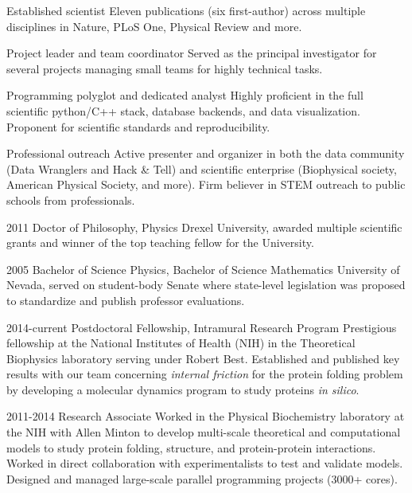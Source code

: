 \documentclass[]{scrartcl}
\begin{document}
\begin{cleanCV}

\vspace{-1em}


\Highlight
{Established scientist}
{Eleven publications (six first-author) across multiple disciplines in Nature, PLoS One, Physical Review and more.}

\Highlight
{Project leader and team coordinator}
{Served as the principal investigator for several projects managing small teams for highly technical tasks.}

\Highlight
{Programming polyglot and dedicated analyst}
{Highly proficient in the full scientific python/C++ stack, database backends, and data visualization. 
Proponent for scientific standards and reproducibility.}

\Highlight
{Professional outreach}
{Active presenter and organizer in both the data community (Data Wranglers and Hack \& Tell) and scientific enterprise (Biophysical society, American Physical Society, and more). Firm believer in STEM outreach to public schools from professionals.}


\WorkExperience
{2011}
{Doctor of Philosophy, Physics}
{Drexel University, awarded multiple scientific grants and winner of the top teaching fellow for the University.}

\WorkExperience
{2005}
{Bachelor of Science Physics, Bachelor of Science Mathematics}
{University of Nevada, served on student-body Senate where state-level legislation was proposed to standardize and publish professor evaluations.}



\WorkExperience
{2014-current}
{Postdoctoral Fellowship, Intramural Research Program}
{
Prestigious fellowship at the National Institutes of Health (NIH) in the Theoretical Biophysics laboratory serving under Robert Best.
Established and published key results with our team concerning \emph{internal friction} for the protein folding problem by developing a molecular dynamics program to study proteins \emph{in silico}.
}

\WorkExperience
{2011-2014}
{Research Associate}
{
Worked in the Physical Biochemistry laboratory at the NIH with Allen Minton to develop multi-scale theoretical and computational models to study protein folding, structure, and protein-protein interactions.
Worked in direct collaboration with experimentalists to test and validate models.
Designed and managed large-scale parallel programming projects (3000+ cores).
}


\end{cleanCV}
\end{document}
